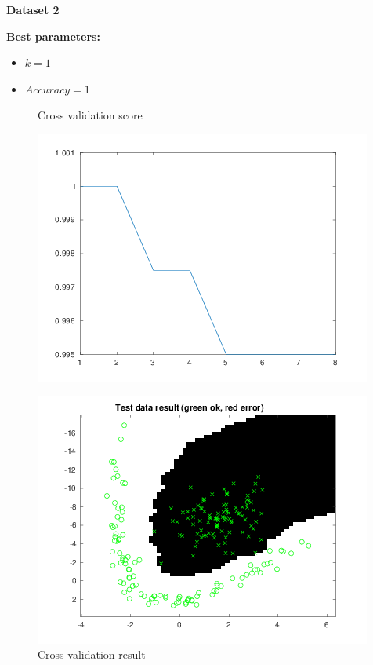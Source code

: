 \documentclass[a4paper,12pt]{article}
\begin{document}
\noindent \textbf{Dataset 2}

\textbf{Best parameters:}
\begin{itemize}
\item $k = 1$
\item $Accuracy = 1$
\end{itemize}

\begin{figure}[H]
\centering
  \begin{minipage}[]{0.49\textwidth}
  \caption{Cross validation score}\label{fig:kNN-2-cv-score}
  \includegraphics[width=\textwidth]{figures/kNN_2_cv_score.png}
  \end{minipage}
  \begin{minipage}[]{0.49\textwidth}
  \caption{Cross validation result}\label{fig:kNN-2-cv}
  \includegraphics[width=\textwidth]{figures/kNN_2_cv.png}
  \end{minipage}
\end{figure}
\end{document}
